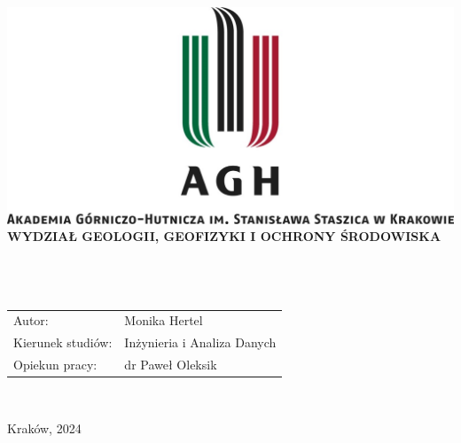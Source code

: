 \documentclass[12pt,a4paper,twoside]{article}
\begin{document}
\thispagestyle{empty}
\begin{center}
\includegraphics[width=\textwidth]{img/logo_AGH.jpg}\\
{\bf{\sf WYDZIAŁ GEOLOGII, GEOFIZYKI I OCHRONY ŚRODOWISKA}}\\[5mm]
{\bf{}}\\[14mm]

{}\\[12mm] 
{}\\[40mm]
\end{center}
{\sf\begin{tabular}{ll}
	Autor: & Monika Hertel\\
	Kierunek studiów: & Inżynieria i Analiza Danych\\
	Opiekun pracy: & dr Paweł Oleksik\\
\end{tabular}}\\[10mm]
\begin{center}
{\sf Kraków, 2024}
\end{center}
\newpage
\tableofcontents
\newpage
\end{document}
